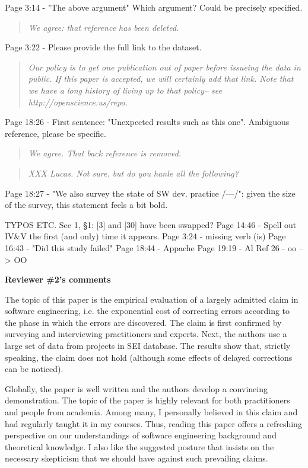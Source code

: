  
Page 3:14 - "The above argument" Which argument? Could be precisely specified.
 

\begin{quote}{\em  We agree: that reference has been deleted. }\end{quote}
 
Page 3:22 - Please provide the full link to the dataset.
 
\begin{quote}{\em  Our policy is to get one publication out of paper
before issueing the data in public. If this paper is accepted, we will certainly add that link. Note that we have a long history of living up to that policy-- see http://openscience.us/repo. }\end{quote}  

 
Page 18:26 - First sentence: "Unexpected results such as this one". Ambiguous reference,
please be specific.  
\begin{quote}{\em  We agree. That back reference is removed. }\end{quote}  

\begin{quote}{\em XXX Lucas. Not sure. but do you hanle all the following? }\end{quote}  

Page 18:27 - "We also survey the state of SW dev. practice /---/": given the size of the survey,
this statement feels a bit bold.

 
TYPOS ETC.  
Sec 1, §1: [3] and [30] have been swapped?  
Page 14:46 - Spell out IV\&V the first (and only) time it appears.
Page 3:24 - missing verb (is) Page 16:43 - "Did this study failed" 
Page 18:44 - Appache 
Page 19:19 - Al Ref 26 - oo --> OO

{\bf Reviewer \#2's comments}

The topic of this paper is the empirical
evaluation of a largely admitted claim in software
engineering, i.e. the exponential cost of correcting errors
according to the phase in which the errors are discovered.
The claim is first confirmed by surveying and interviewing
practitioners and experts. Next, the authors use a large set
of data from projects in SEI database. The results show
that, strictly speaking, the claim does not hold (although
some effects of delayed corrections can be noticed).

Globally, the paper is well written and the authors develop
a convincing demonstration. The topic of the paper is highly
relevant for both practitioners and people from academia.
Among many, I personally believed in this claim and had
regularly taught it in my courses. Thus, reading this paper
offers a refreshing perspective on our understandings of
software engineering background and theoretical knowledge. I
also like the suggested posture that insists on the
necessary skepticism that we should have against such
prevailing claims.

